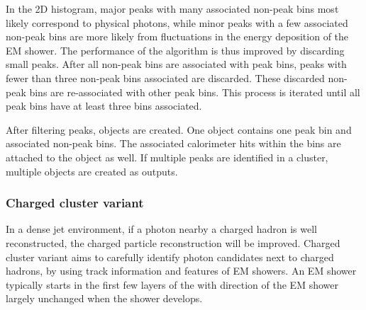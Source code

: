 


In the 2D histogram,  major peaks with many associated non-peak bins most likely correspond to physical photons, while minor peaks with a few associated non-peak bins are more likely from fluctuations in the energy deposition of the EM shower. The performance of the \peakFinding algorithm is thus improved by discarding small peaks.  After all non-peak bins are associated with peak bins, peaks with fewer than three non-peak bins associated are discarded. These discarded non-peak bins are re-associated with other peak bins. This  process is iterated until all peak bins have at least three bins associated.





After  filtering peaks,  \ShowerPeak  objects are created. One \ShowerPeak object contains one peak bin and associated non-peak bins. The associated calorimeter hits within the bins are attached to the \ShowerPeak object as well. If multiple peaks are identified in a cluster, multiple \ShowerPeak objects are created as outputs.



\subsubsection{Charged cluster variant}
\label{sec:photon2Dtrack}

In a dense jet environment, if a photon nearby a charged hadron is well reconstructed, the charged particle reconstruction will be improved. Charged cluster variant aims to carefully identify photon candidates next to charged hadrons, by using track information and features of EM showers. An EM shower typically starts in the first few layers of the \ECAL with  direction of the EM shower largely unchanged when the shower develops.



